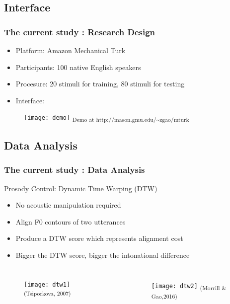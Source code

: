 \documentclass{beamer}
\begin{document}
\subsection{Interface}
\begin{frame}
\frametitle{The current study : Research Design}
\begin{itemize}
\item Platform: Amazon Mechanical Turk 
\item Participants: 100 native English speakers
\item Procesure: 20 stimuli for training, 80 stimuli for testing
\item Interface:
\end{itemize}
\begin{figure}
\texttt{[image: demo]}
\linebreak \textsubscript{Demo at http://mason.gmu.edu/\~{}zgao/mturk}
\end{figure}
\end{frame}


\subsection{Data Analysis}

\begin{frame}
\frametitle{The current study : Data Analysis}
Prosody Control: Dynamic Time Warping (DTW) 
\begin{itemize}
\item No acoustic manipulation required
\item Align F0 contours of two utterances
\item Produce a DTW score which represents alignment cost
\item Bigger the DTW score, bigger the intonational difference
\end{itemize}
\begin{columns}[c] %
\begin{figure}
\texttt{[image: dtw1]}
\linebreak \textsubscript{(Tsiporkova, 2007) }
\end{figure}
\begin{figure}
\texttt{[image: dtw2]}
\linebreak\textsubscript{(Morrill \& Gao,2016)}
\end{figure}
\end{columns}
\end{frame}
\end{document}
